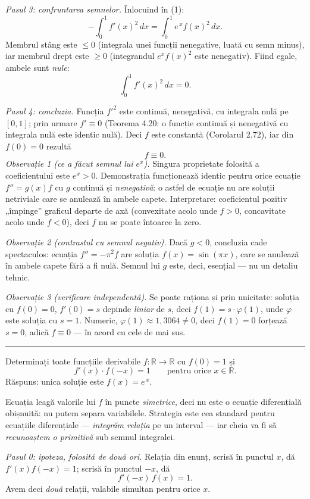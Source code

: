 \emph{Pasul 3: confruntarea semnelor.} Înlocuind în (1):
\[ -\int_{0}^{1}f'(x)^{2}\,dx=\int_{0}^{1}e^{\,x}f(x)^{2}\,dx . \]
Membrul stâng este $\le0$ (integrala unei funcții nenegative, luată cu semn minus), iar membrul drept este $\ge0$ (integrandul $e^{x}f(x)^{2}$ este nenegativ). Fiind egale, ambele sunt \emph{nule}:
\[ \int_{0}^{1}f'(x)^{2}\,dx=0 . \]

\emph{Pasul 4: concluzia.} Funcția $f'^{2}$ este continuă, nenegativă, cu integrala nulă pe $[0,1]$; prin urmare $f'\equiv0$ (Teorema 4.20: o funcție continuă și nenegativă cu integrala nulă este identic nulă). Deci $f$ este constantă (Corolarul 2.72), iar din $f(0)=0$ rezultă
\[ f\equiv0 . \]
\emph{Observație 1 (ce a făcut semnul lui $e^{x}$).} Singura proprietate folosită a coeficientului este $e^{x}>0$. Demonstrația funcționează identic pentru orice ecuație $f''=g(x)f$ cu $g$ continuă și \emph{nenegativă}: o astfel de ecuație nu are soluții netriviale care se anulează în ambele capete. Interpretare: coeficientul pozitiv „împinge'' graficul departe de axă (convexitate acolo unde $f>0$, concavitate acolo unde $f<0$), deci $f$ nu se poate întoarce la zero.

\emph{Observație 2 (contrastul cu semnul negativ).} Dacă $g<0$, concluzia cade spectaculos: ecuația $f''=-\pi^{2}f$ are soluția $f(x)=\sin(\pi x)$, care se anulează în ambele capete fără a fi nulă. Semnul lui $g$ este, deci, esențial --- nu un detaliu tehnic.

\emph{Observație 3 (verificare independentă).} Se poate raționa și prin unicitate: soluția cu $f(0)=0$, $f'(0)=s$ depinde \emph{liniar} de $s$, deci $f(1)=s\cdot\varphi(1)$, unde $\varphi$ este soluția cu $s=1$. Numeric, $\varphi(1)\approx1{,}3064\neq0$, deci $f(1)=0$ forțează $s=0$, adică $f\equiv0$ --- în acord cu cele de mai sus.
\vspace{1mm}\hrule

Determinați toate funcțiile derivabile $f:\mathbb{R}\to\mathbb{R}$ cu $f(0)=1$ și
\[ f'(x)\cdot f(-x)=1\qquad\text{pentru orice }x\in\mathbb{R} . \]
\sol Răspuns: unica soluție este $f(x)=e^{\,x}$.

Ecuația leagă valorile lui $f$ în puncte \emph{simetrice}, deci nu este o ecuație diferențială obișnuită: nu putem separa variabilele. Strategia este cea standard pentru ecuațiile diferențiale --- \emph{integrăm relația} pe un interval --- iar cheia va fi să \emph{recunoaștem o primitivă} sub semnul integralei.

\emph{Pasul 0: ipoteza, folosită de două ori.} Relația din enunț, scrisă în punctul $x$, dă $f'(x)f(-x)=1$; scrisă în punctul $-x$, dă
\[ f'(-x)\,f(x)=1 . \]
Avem deci \emph{două} relații, valabile simultan pentru orice $x$.

